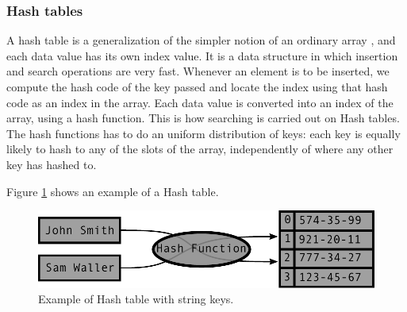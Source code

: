 \documentclass{sig-alternate-05-2015}
\begin{document}
    \subsubsection{Hash tables}
        A hash table is a generalization of the simpler notion of an ordinary array
        \cite{Cormen:Algorithms}, and each data value has its own index value.
        It is a data structure in which insertion and search operations are very fast. \cite{Tuto:Data}
        Whenever an element is to be inserted, we compute the hash code of the key passed and
        locate the index using that hash code as an index in the array.
        Each data value is converted into an index of the array, using a hash function.
        This is how searching is carried out on Hash tables. The hash functions has to
        do an uniform distribution of keys: each key is equally likely to hash to any of
        the slots of the array, independently of where any other key has hashed to. \cite{Cormen:Algorithms}

        Figure \ref{img:Hash} shows an example of a Hash table.
        \begin{figure}
          \centering
          \includegraphics[scale=0.57]{Hash.pdf}
          \caption{Example of Hash table with string keys.}
          \label{img:Hash}
        \end{figure}
\end{document}
